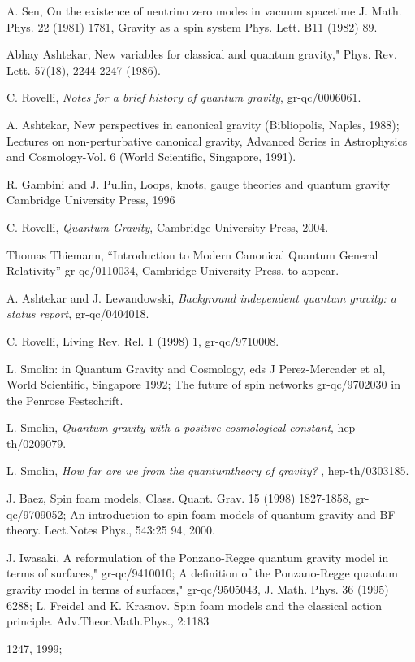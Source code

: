 \documentclass[12pt]{article}
\begin{document}
\begin{thebibliography}{0}


A. Sen, On the existence of neutrino zero modes in vacuum
spacetime J. Math. Phys. 22 (1981) 1781,
Gravity as a spin system Phys. Lett. B11 (1982) 89.

Abhay Ashtekar,
New variables for classical and quantum gravity," Phys. Rev. Lett.
57(18), 2244-2247 (1986).

C. Rovelli,
{\it Notes for a brief history of quantum gravity},
 gr-qc/0006061. 


A. Ashtekar,
New perspectives in canonical gravity (Bibliopolis, Naples,
1988); Lectures on non-perturbative canonical gravity, Advanced Series in
Astrophysics
and Cosmology-Vol. 6 (World Scientific, Singapore, 1991).

R. Gambini and J. Pullin, Loops, knots, gauge theories and
quantum gravity Cambridge University Press, 1996

C. Rovelli, {\it Quantum Gravity}, Cambridge University Press, 2004. 

Thomas Thiemann,
``Introduction to Modern Canonical Quantum General Relativity'' gr-qc/0110034, Cambridge University Press, to appear. 

A. Ashtekar and J. Lewandowski, {\it Background independent quantum gravity: a status report}, gr-qc/0404018.

C. Rovelli,  Living Rev. Rel. 1 (1998) 1, gr-qc/9710008.

L. Smolin: in
Quantum Gravity and Cosmology, eds J Perez-Mercader et al, World
Scientific, Singapore 1992; The future of spin networks gr-qc/9702030
in the Penrose
Festschrift.

L. Smolin, {\it Quantum gravity with
a positive cosmological constant}, hep-th/0209079.

L. Smolin, {\it How far are we from the quantumtheory of gravity?} ,  hep-th/0303185. 

J. Baez, Spin foam models, Class. Quant. Grav. 15
(1998) 1827-1858, gr-qc/9709052;  An introduction to spin foam models of
quantum gravity
and BF theory. Lect.Notes Phys., 543:25 94, 2000.

J. Iwasaki, A reformulation of the Ponzano-Regge
quantum gravity model
in terms of surfaces," gr-qc/9410010; A definition of the Ponzano-Regge
quantum gravity model in terms of surfaces," gr-qc/9505043, J. Math.
Phys. 36 (1995) 6288;
L. Freidel and K. Krasnov. Spin foam models and the classical action
principle. Adv.Theor.Math.Phys., 2:1183{1247, 1999; 


}
\end{thebibliography}
\end{document}
